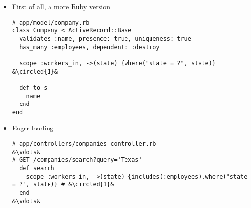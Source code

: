 \documentclass{beamer}
\newcommand*\circled[1]{\tikz[baseline=(char.base)]{
            \node[shape=circle,draw,inner sep=2pt] (char) {#1};}}
\begin{document}
\begin{frame}
\begin{itemize}
\begin{itemize}
\lstset{language=shell}
\begin{lstlisting}[escapechar=!]
Started GET "/search?state=Texas" for 127.0.0.1 at 2014-04-06 21:31:42 +0100
  ActiveRecord::SchemaMigration Load (0.6ms)  SELECT "schema_migrations".* FROM "schema_migrations"
Processing by CompaniesController#search as HTML
  Parameters: {"state"=>"Texas"}
  Company Load (120.6ms)  SELECT "companies".* FROM "companies" WHERE (state = 'Texas')
  Employee Load (22.3ms)  SELECT "employees".* FROM "employees" WHERE "employees"."company_id" = ?  [["company_id", 53]]
  Employee Load (0.6ms)  SELECT "employees".* FROM "employees" WHERE "employees"."company_id" = ?  [["company_id", 82]]
  Employee Load (1.2ms)  SELECT "employees".* FROM "employees" WHERE "employees"."company_id" = ?  [["company_id", 88]]
&\vdots&
  Employee Load (0.5ms)  SELECT "employees".* FROM "employees" WHERE "employees"."company_id" = ?  [["company_id", 2466]]
  Employee Load (0.9ms)  SELECT "employees".* FROM "employees" WHERE "employees"."company_id" = ?  [["company_id", 2485]]
  Employee Load (0.8ms)  SELECT "employees".* FROM "employees" WHERE "employees"."company_id" = ?  [["company_id", 2549]]
  Rendered companies/search.html.erb within layouts/application (881.4ms)
Completed 200 OK in 1441ms (Views: 1154.4ms | !{\color{red}ActiveRecord: 199.8ms}!)
\end{lstlisting}

\end{itemize}

\item First of all, a more Ruby version

\lstset{language=Ruby, style=eclipse}
\begin{lstlisting}[escapechar=&]
# app/model/company.rb
class Company < ActiveRecord::Base
  validates :name, presence: true, uniqueness: true
  has_many :employees, dependent: :destroy

  scope :workers_in, ->(state) {where("state = ?", state)} &\circled{1}&

  def to_s
    name
  end
end
\end{lstlisting}

\item Eager loading

\lstset{language=Ruby, style=eclipse}
\begin{lstlisting}[escapechar=&]
# app/controllers/companies_controller.rb
&\vdots&
# GET /companies/search?query='Texas'
  def search
    scope :workers_in, ->(state) {includes(:employees).where("state = ?", state)} # &\circled{1}&
  end
&\vdots&
\end{lstlisting}


\end{itemize}
\end{frame}
\end{document}
